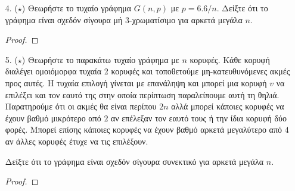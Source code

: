 \documentclass[a4paper, oneside, 11pt]{article}
\theoremstyle{definition}
\begin{document}
\begin{enumerate}
   \begin{itemize}
      \item Για $k = 1, \ldots, n$ ποιά η πιθανότητα $r(v) = k$. Η πιθανότητα θα
            έχει μορφή γινομένου.
      \item Δείξτε ότι για μία κορυφή $v$, $Pr[ r(v) \leq \sqrt{n} / 10 ]
            \leq 1/3$ και $Pr [ r(v) \geq 10\sqrt{n} ] \leq 1/3$.
   \end{itemize}

   \begin{proof}
   \end{proof}

\item[4. ($\star$)]
   Θεωρήστε το τυχαίο γράφημα $G(n, p)$ με $p = 6.6/n$. Δείξτε ότι το γράφημα
   είναι σχεδόν σίγουρα μή 3-χρωματίσιμο για αρκετά μεγάλα $n$.

   \begin{proof}
   \end{proof}

\item[5. ($\star$)]
   Θεωρήστε το παρακάτω τυχαίο γράφημα με $n$ κορυφές. Κάθε κορυφή διαλέγει
   ομοιόμορφα τυχαία 2 κορυφές και τοποθετούμε μη-κατευθυνόμενες ακμές προς
   αυτές. Η τυχαία επιλογή γίνεται με επανάληψη και μπορεί μια κορυφή $v$ να
   επιλέξει και τον εαυτό της στην οποία περίπτωση παραλείπουμε αυτή τη θηλιά.
   Παρατηρούμε ότι οι ακμές θα είναι περίπου $2n$ αλλά μπορεί κάποιες κορυφές να
   έχουν βαθμό μικρότερο από $2$ αν επέλεξαν τον εαυτό τους ή την ίδια κορυφή
   δύο φορές. Μπορεί επίσης κάποιες κορυφές να έχουν βαθμό αρκετά μεγαλύτερο από
   $4$ αν άλλες κορυφές έτυχε να τις επιλέξουν.

   Δείξτε ότι το γράφημα είναι σχεδόν σίγουρα συνεκτικό για αρκετά μεγάλα $n$.

   \begin{proof}
   \end{proof}

\end{enumerate}
\end{document}
